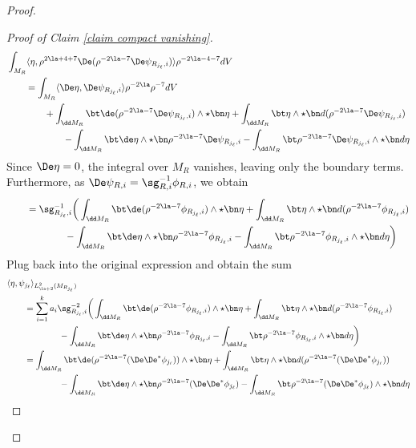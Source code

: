 \documentclass[hidelinks, 12pt, oneside, reqno]{amsart}
\begin{document}
\begin{proof}
\begin{proof}[Proof of Claim \ref{claim compact vanishing}]
\begin{align*}
        & \int_{M_R} \langle \eta, \rho^{2\la + 4 + 7}\De(\rho^{-2\la - 7} \De \psi_{R_{j_\ell}, i}) \rangle \rho^{-2\la -4 - 7} dV \\
        &\qquad = \int_{M_R} \langle \De \eta, \De \psi_{R_{j_\ell}, i}\rangle \rho^{-2\la}\rho^{-7} dV\\
        &\qquad \qquad + \int_{\dd M_R} \bt \de (\rho^{-2\la- 7} \De \psi_{R_{j_\ell}, i}) \wedge \star \bn \eta + \int_{\dd M_R} \bt \eta \wedge \star \bn d (\rho^{-2\la- 7} \De \psi_{R_{j_\ell}, i}) \\
        &\qquad \qquad \qquad - \int_{\dd M_R} \bt \de \eta \wedge \star \bn \rho^{-2\la- 7} \De \psi_{R_{j_\ell}, i} - \int_{\dd M_R} \bt \rho^{-2\la- 7} \De \psi_{R_{j_\ell}, i} \wedge \star \bn d \eta 
    \end{align*}
    Since $\De \eta = 0$, the integral over $M_R$ vanishes, leaving only the boundary terms. Furthermore, as $\De \psi_{R,i} = \sg_{R,i}^{-1} \phi_{R,i}$, we obtain
    \begin{align*}
        &\qquad = \sg_{R_{j_\ell},i}^{-1}\bigg(\int_{\dd M_R} \bt \de (\rho^{-2\la- 7} \phi_{R_{j_\ell}, i}) \wedge \star \bn \eta + \int_{\dd M_R} \bt \eta \wedge \star \bn d (\rho^{-2\la- 7} \phi_{R_{j_\ell}, i}) \\
        &\qquad \qquad \qquad - \int_{\dd M_R} \bt \de \eta \wedge \star \bn \rho^{-2\la- 7} \phi_{R_{j_\ell}, i} - \int_{\dd M_R} \bt \rho^{-2\la- 7} \phi_{R_{j_\ell}, i} \wedge \star \bn d \eta \bigg)
    \end{align*}
    Plug back into the original expression and obtain the sum
    \begin{align*}
        &\langle \eta, \psi_{j_\ell} \rangle_{L^2_{\la + 2}(M_{R_{j_\ell}})}\\
        &\qquad = \sum_{i=1}^k a_i\sg_{R_{j_\ell},i}^{-2}\bigg(\int_{\dd M_R} \bt \de (\rho^{-2\la- 7} \phi_{R_{j_\ell}, i}) \wedge \star \bn \eta + \int_{\dd M_R} \bt \eta \wedge \star \bn d (\rho^{-2\la- 7} \phi_{R_{j_\ell}, i}) \\
        &\qquad \qquad \qquad - \int_{\dd M_R} \bt \de \eta \wedge \star \bn \rho^{-2\la- 7} \phi_{R_{j_\ell}, i} - \int_{\dd M_R} \bt \rho^{-2\la- 7} \phi_{R_{j_\ell}, i} \wedge \star \bn d \eta \bigg)\\
        &\qquad = \int_{\dd M_R} \bt \de (\rho^{-2\la- 7} (\De \De^* \phi_{j_\ell})) \wedge \star \bn \eta + \int_{\dd M_R} \bt \eta \wedge \star \bn d (\rho^{-2\la- 7} (\De \De^* \phi_{j_\ell})) \\
        &\qquad \qquad \qquad - \int_{\dd M_R} \bt \de \eta \wedge \star \bn \rho^{-2\la- 7} (\De \De^* \phi_{j_\ell}) - \int_{\dd M_R} \bt \rho^{-2\la- 7} (\De \De^* \phi_{j_\ell}) \wedge \star \bn d \eta 

\end{align*}
\end{proof}
\end{proof}
\end{document}
